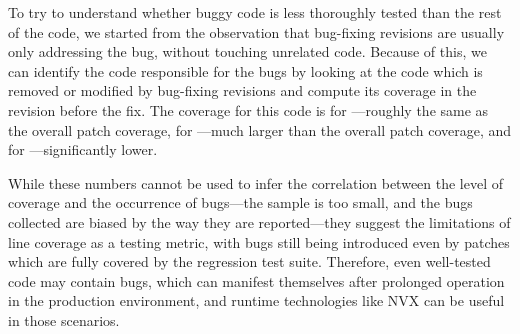 To try to understand whether buggy code is less thoroughly tested than
the rest of the code, we started from the observation that bug-fixing
revisions are usually only addressing the bug, without touching
unrelated code.  Because of this, we can identify the code responsible
for the bugs by looking at the code which is removed or modified by
bug-fixing revisions and compute its coverage in the revision before
the fix.  The coverage for this code is \memcachedBugLineCoverage
for \memcached---roughly the same as the overall patch
coverage, \redisBugLineCoverage for \redis---much larger than the
overall patch coverage, and \zeromqBugLineCoverage
for \zeromq---significantly lower.




While these numbers cannot be used to infer the correlation between
the level of coverage and the occurrence of bugs---the sample is too
small, and the bugs collected are biased by the way they are
reported---they suggest the limitations of line coverage as a testing
metric, with bugs still being introduced even by patches which are
fully covered by the regression test suite. Therefore, even well-tested
code may contain bugs, which can manifest themselves after prolonged
operation in the production environment, and runtime technologies like
NVX can be useful in those scenarios.


